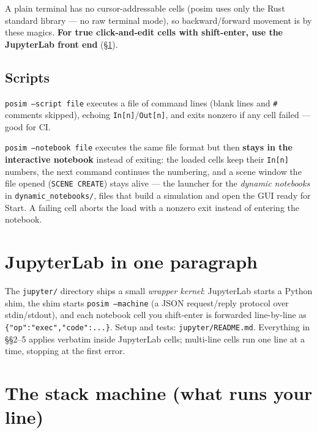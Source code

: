 \documentclass[11pt]{article}
\newcommand{\code}[1]{\texttt{#1}}
\begin{document}
A plain terminal has no cursor-addressable cells (posim uses only the
Rust standard library --- no raw terminal mode), so backward/forward
movement is by these magics. \textbf{For true click-and-edit cells with
shift-enter, use the JupyterLab front end} (\S\ref{sec:jlab}).

\subsection{Scripts}
\code{posim --script file} executes a file of command lines (blank lines
and \code{\#} comments skipped), echoing \code{In[n]}/\code{Out[n]}, and
exits nonzero if any cell failed --- good for CI.

\code{posim --notebook file} executes the same file format but then
\textbf{stays in the interactive notebook} instead of exiting: the
loaded cells keep their \code{In[n]} numbers, the next command
continues the numbering, and a scene window the file opened
(\code{SCENE CREATE}) stays alive --- the launcher for the
\emph{dynamic notebooks} in \code{dynamic\_notebooks/}, files that
build a simulation and open the GUI ready for Start. A failing cell
aborts the load with a nonzero exit instead of entering the notebook.

\section{JupyterLab in one paragraph}\label{sec:jlab}

The \code{jupyter/} directory ships a small \emph{wrapper kernel}:
JupyterLab starts a Python shim, the shim starts \code{posim --machine}
(a JSON request/reply protocol over stdin/stdout), and each notebook
cell you shift-enter is forwarded line-by-line as
\code{\{"op":"exec","code":...\}}. Setup and tests:
\code{jupyter/README.md}. Everything in \S\S2--5 applies verbatim inside
JupyterLab cells; multi-line cells run one line at a time, stopping at
the first error.

\section{The stack machine (what runs your line)}
\end{document}
